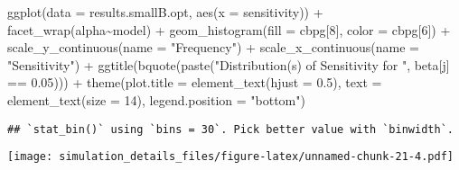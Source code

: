 \documentclass[
]{article}
\newenvironment{Shaded}{\begin{snugshade}}{\end{snugshade}}
\newcommand{\AttributeTok}[1]{\textcolor[rgb]{0.77,0.63,0.00}{#1}}
\newcommand{\DecValTok}[1]{\textcolor[rgb]{0.00,0.00,0.81}{#1}}
\newcommand{\FloatTok}[1]{\textcolor[rgb]{0.00,0.00,0.81}{#1}}
\newcommand{\FunctionTok}[1]{\textcolor[rgb]{0.00,0.00,0.00}{#1}}
\newcommand{\NormalTok}[1]{#1}
\newcommand{\SpecialCharTok}[1]{\textcolor[rgb]{0.00,0.00,0.00}{#1}}
\newcommand{\StringTok}[1]{\textcolor[rgb]{0.31,0.60,0.02}{#1}}
\begin{document}
\begin{Shaded}
\begin{Highlighting}[]
\FunctionTok{ggplot}\NormalTok{(}\AttributeTok{data =}\NormalTok{ results.smallB.opt,}
       \FunctionTok{aes}\NormalTok{(}\AttributeTok{x =}\NormalTok{ sensitivity)) }\SpecialCharTok{+}
  \FunctionTok{facet\_wrap}\NormalTok{(alpha}\SpecialCharTok{\textasciitilde{}}\NormalTok{model) }\SpecialCharTok{+}
  \FunctionTok{geom\_histogram}\NormalTok{(}\AttributeTok{fill =}\NormalTok{ cbpg[}\DecValTok{8}\NormalTok{], }\AttributeTok{color =}\NormalTok{ cbpg[}\DecValTok{6}\NormalTok{]) }\SpecialCharTok{+}
  \FunctionTok{scale\_y\_continuous}\NormalTok{(}\AttributeTok{name =} \StringTok{"Frequency"}\NormalTok{) }\SpecialCharTok{+}
  \FunctionTok{scale\_x\_continuous}\NormalTok{(}\AttributeTok{name =} \StringTok{"Sensitivity"}\NormalTok{) }\SpecialCharTok{+}
  \FunctionTok{ggtitle}\NormalTok{(}\FunctionTok{bquote}\NormalTok{(}\FunctionTok{paste}\NormalTok{(}\StringTok{"Distribution(s) of Sensitivity for "}\NormalTok{, beta[j] }\SpecialCharTok{==} \FloatTok{0.05}\NormalTok{))) }\SpecialCharTok{+}
  \FunctionTok{theme}\NormalTok{(}\AttributeTok{plot.title =} \FunctionTok{element\_text}\NormalTok{(}\AttributeTok{hjust =} \FloatTok{0.5}\NormalTok{), }
        \AttributeTok{text =} \FunctionTok{element\_text}\NormalTok{(}\AttributeTok{size =} \DecValTok{14}\NormalTok{),}
        \AttributeTok{legend.position =} \StringTok{"bottom"}\NormalTok{)}
\end{Highlighting}
\end{Shaded}

\begin{verbatim}
## `stat_bin()` using `bins = 30`. Pick better value with `binwidth`.
\end{verbatim}

\texttt{[image: simulation\_details\_files/figure-latex/unnamed-chunk-21-4.pdf]}
\end{document}
